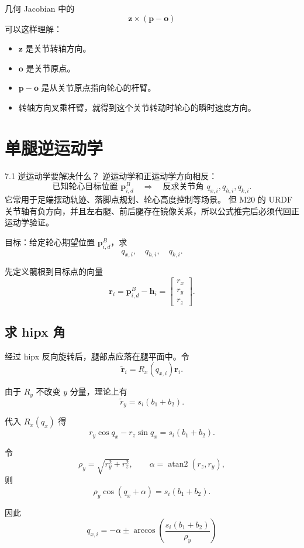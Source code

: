 \documentclass[UTF8,11pt,a4paper]{ctexart}
\newcommand{\bs}[1]{\bm{#1}}
\newcommand{\rx}{R_x}
\newcommand{\ry}{R_y}
\begin{document}
几何 Jacobian 中的
\[
\bs z\times(\bs p-\bs o)
\]
可以这样理解：

\begin{itemize}
  \item \(\bs z\) 是关节转轴方向。
  \item \(\bs o\) 是关节原点。
  \item \(\bs p-\bs o\) 是从关节原点指向轮心的杆臂。
  \item 转轴方向叉乘杆臂，就得到这个关节转动时轮心的瞬时速度方向。
\end{itemize}

\section{单腿逆运动学}

\begin{greenbox}{7.1 逆运动学要解决什么？}
逆运动学和正运动学方向相反：
\[
\text{已知轮心目标位置 } \bs p_{i,d}^B
\quad\Longrightarrow\quad
\text{反求关节角 }q_{x,i},q_{h,i},q_{k,i}.
\]
它常用于足端摆动轨迹、落脚点规划、轮心高度控制等场景。
但 M20 的 URDF 关节轴有负方向，并且左右腿、前后腿存在镜像关系，所以公式推完后必须代回正运动学验证。
\end{greenbox}

目标：给定轮心期望位置 \(\bs p_{i,d}^B\)，求
\[
q_{x,i},\quad q_{h,i},\quad q_{k,i}.
\]

先定义髋根到目标点的向量
\[
\bs r_i =
\bs p_{i,d}^B-\bs h_i
=
\begin{bmatrix}
r_x\\r_y\\r_z
\end{bmatrix}.
\]

\subsection{求 hipx 角}

经过 hipx 反向旋转后，腿部点应落在腿平面中。令
\[
\tilde{\bs r}_i
=
\rx(q_{x,i})\bs r_i.
\]

由于 \(\ry\) 不改变 \(y\) 分量，理论上有
\[
\tilde r_y
=
s_i(b_1+b_2).
\]

代入 \(\rx(q_x)\) 得
\[
r_y\cos q_x-r_z\sin q_x
=
s_i(b_1+b_2).
\]

令
\[
\rho_y=\sqrt{r_y^2+r_z^2},\qquad
\alpha=\operatorname{atan2}(r_z,r_y),
\]
则
\[
\rho_y\cos(q_x+\alpha)
=
s_i(b_1+b_2).
\]

因此
\[
\boxed{
q_{x,i}
=
-\alpha
\pm
\arccos
\left(
\frac{s_i(b_1+b_2)}{\rho_y}
\right)
}
\]
\end{document}

